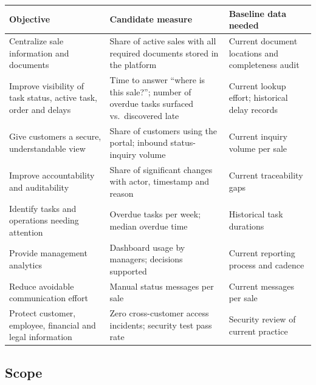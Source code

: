 \documentclass[11pt,a4paper]{article}
\begin{document}
\begin{longtable}{@{}L{4.6cm}L{5.8cm}L{5.4cm}@{}}
	\toprule
	\textbf{Objective}                                               &
	\textbf{Candidate measure}
	                                                                 &
	\textbf{Baseline data
		needed}
	\\
	\midrule
	\endhead
	Centralize sale information and documents                        & Share of
	active sales with all
	required documents stored in the platform                        & Current
	document locations and
	completeness audit
	\\
	Improve visibility of task status, active task, order and delays & Time to
	answer ``where is this sale?''; number of overdue tasks surfaced vs.\
	discovered
	late                                                             & Current
	lookup effort; historical delay records
	\\
	Give customers a secure, understandable view                     & Share of
	customers using the portal; inbound status-inquiry volume
	                                                                 & Current
	inquiry volume per sale
	\\
	Improve accountability and auditability                          & Share of
	significant changes with actor, timestamp and reason             & Current
	traceability gaps
	\\
	Identify tasks and operations needing attention                  & Overdue
	tasks per week; median overdue time                              & Historical
	task
	durations
	\\
	Provide management analytics                                     & Dashboard
	usage by managers; decisions supported                           & Current
	reporting process
	and cadence
	\\
	Reduce avoidable communication effort                            & Manual
	status messages per sale                                         & Current
	messages per sale
	\\
	Protect customer, employee, financial and legal information      & Zero
	cross-customer access incidents; security test pass rate
	                                                                 & Security
	review of current practice
	\\
	\bottomrule
\end{longtable}

\subsection{Scope}
\end{document}
